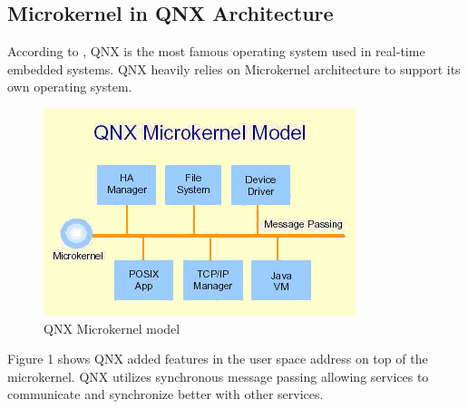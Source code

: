 \documentclass[conference]{IEEEtran}
\newcommand{\forceindent}{\leavevmode{\parindent=1em\indent}}
\begin{document}
\medskip
\subsection{Microkernel in QNX Architecture}
According to \cite{embhack}, QNX is the most famous operating system used in real-time embedded systems. QNX  heavily relies on Microkernel architecture to support its own operating system\cite{Galvinbook}\cite{Burger}.

\begin{figure}[h]
\caption{QNX Microkernel model}
\begin{center}
\includegraphics[scale=0.5]{./images/QNX_microkernel_mode.png}
\end{center}
\end{figure}

\forceindent Figure 1 shows QNX added features in the user space address on top of the microkernel. QNX utilizes synchronous message passing allowing services to communicate and synchronize better\cite{Burger} with other services.

\end{document}
